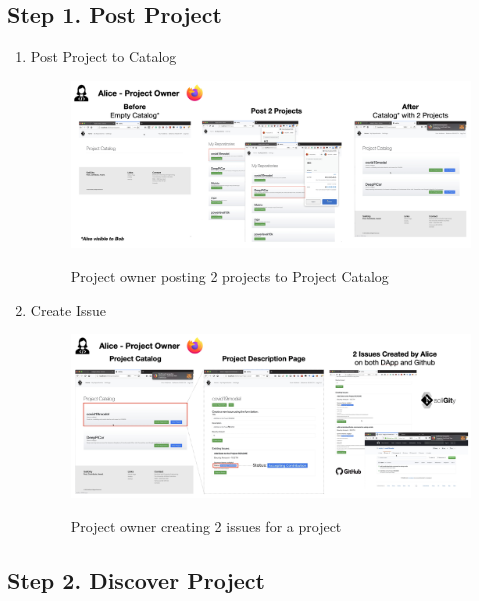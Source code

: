 \documentclass[12pt]{article}
\renewcommand{\_}{\kern-1.5pt\textunderscore\kern-1.5pt}
\begin{document}
\subsection*{Step 1. Post Project}
\begin{enumerate}
	\item Post Project to Catalog
	      \begin{figure}[H]
		      \centering
		      \includegraphics[width=16.5cm]{graphs/50. post_1.png}\\
		      \caption{Project owner posting 2 projects to Project Catalog}
		      \label{fig:post1}
	      \end{figure}

	\item Create Issue

	      \begin{figure}[H]
		      \centering
		      \includegraphics[width=16.5cm]{graphs/51. post_2.png}\\
		      \caption{Project owner creating 2 issues for a project}
		      \label{fig:post2}
	      \end{figure}

\end{enumerate}


\subsection*{Step 2. Discover Project}
\end{document}

